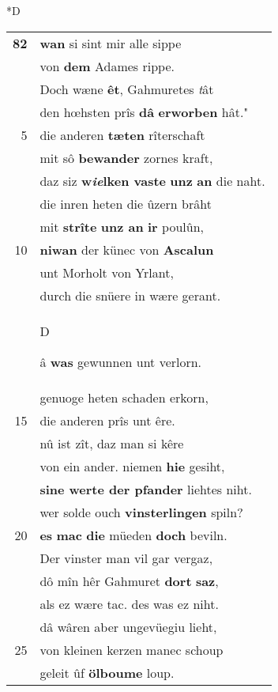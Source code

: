 \documentclass[8pt,a4paper,notitlepage]{article}
\begin{document}
\begin{table}[ht]
\begin{minipage}[t]{0.5\linewidth}
\small
\begin{center}*D
\end{center}
\begin{tabular}{rl}
\textbf{82} & \textbf{wan} si sint mir alle sippe\\ 
 & von \textbf{dem} Adames rippe.\\ 
 & Doch wæne \textbf{êt}, Gahmuretes \textit{t}ât\\ 
 & den hœhsten prîs \textbf{dâ} \textbf{erworben} hât."\\ 
5 & die anderen \textbf{tæten} rîterschaft\\ 
 & mit sô \textbf{bewander} zornes kraft,\\ 
 & daz siz \textbf{w\textit{ie}lken vaste} \textbf{unz} \textbf{an} die naht.\\ 
 & die inren heten die ûzern brâht\\ 
 & mit \textbf{strîte} \textbf{unz an} \textbf{ir} poulûn,\\ 
10 & \textbf{niwan} der künec von \textbf{Ascalun}\\ 
 & unt Morholt von Yrlant,\\ 
 & durch die snüere in wære gerant.\\ 
 & \begin{large}D\end{large}â \textbf{was} gewunnen unt verlorn.\\ 
 & genuoge heten schaden erkorn,\\ 
15 & die anderen prîs unt êre.\\ 
 & nû ist zît, daz man si kêre\\ 
 & von ein ander. niemen \textbf{hie} gesiht,\\ 
 & \textbf{sine werte der pfander} liehtes niht.\\ 
 & wer solde ouch \textbf{vinsterlingen} spiln?\\ 
20 & \textbf{es} \textbf{mac} \textbf{die} müeden \textbf{doch} beviln.\\ 
 & Der vinster man vil gar vergaz,\\ 
 & dô mîn hêr Gahmuret \textbf{dort} \textbf{saz},\\ 
 & als ez wære tac. des was ez niht.\\ 
 & dâ wâren aber ungevüegiu lieht,\\ 
25 & von kleinen kerzen manec schoup\\ 
 & geleit ûf \textbf{ölboume} loup.\\ 

\end{tabular}
\end{minipage}
\end{table}
\end{document}
